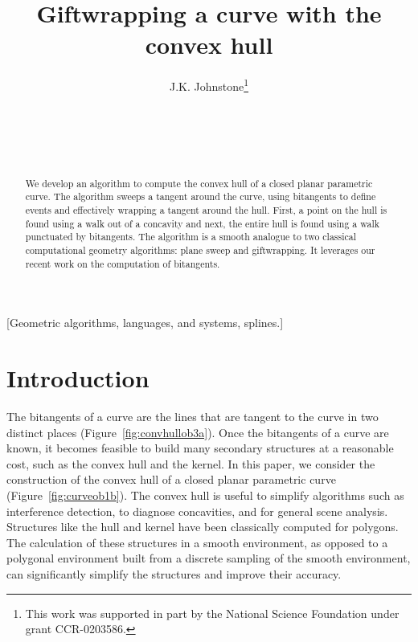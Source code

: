 \documentclass{sig-alternate}
\title{Giftwrapping a curve with the convex hull}
\author{
\alignauthor J.K. Johnstone\thanks{This work was supported in part by the National Science Foundation under grant CCR-0203586.}\\
\affaddr{Geometric Modeling Lab}\\
\affaddr{Computer and Information Sciences}\\
\affaddr{University of Alabama at Birmingham}\\
\affaddr{University Station, Birmingham, AL, USA 35294}\\
\email{jj@cis.uab.edu}
}
\begin{document}
\maketitle

\begin{abstract}
We develop an algorithm to compute the convex hull of a closed planar parametric curve.
The algorithm sweeps a tangent around the curve, using bitangents
to define events and effectively wrapping a tangent around the hull.
First, a point on the hull is found using a walk out of a concavity and next,
the entire hull is found using a walk punctuated by bitangents.
The algorithm is a smooth analogue to two classical computational geometry algorithms:
plane sweep and giftwrapping.
It leverages our recent work on the computation of bitangents.
\end{abstract}

[Geometric algorithms, languages, and systems, splines.]


\section{Introduction}

The bitangents of a curve are the lines that are tangent to the curve in two distinct places
(Figure~\ref{fig:convhullob3a}).
Once the bitangents of a curve are known, 
it becomes feasible to build many secondary structures at a reasonable cost,
such as the convex hull and the kernel.
In this paper, we consider the construction of the convex hull of a closed planar parametric curve
(Figure~\ref{fig:curveob1b}).
The convex hull is useful to simplify algorithms such as interference detection,
to diagnose concavities, and for general scene analysis.
Structures like the hull and kernel have been classically computed for polygons.
The calculation of these structures in a smooth environment,
as opposed to a polygonal environment built from a discrete sampling of the
smooth environment, can significantly simplify the structures and improve their accuracy.
\end{document}
